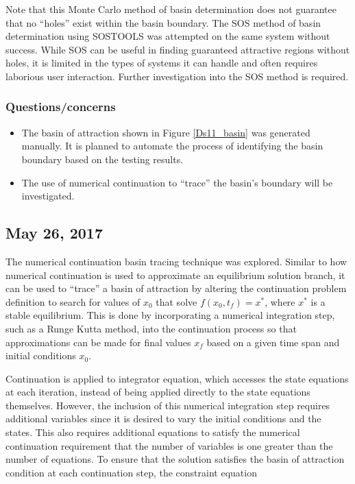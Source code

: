 \documentclass[12pt]{article}
\begin{document}
Note that this Monte Carlo method of basin determination does not guarantee that no ``holes'' exist within the basin boundary. The SOS method of basin determination using SOSTOOLS \cite{sostools} was attempted on the same system without success. While SOS can be useful in finding guaranteed attractive regions without holes, it is limited in the types of systems it can handle and often requires laborious user interaction. Further investigation into the SOS method is required.

\subsubsection{Questions/concerns}
\begin{itemize}
\item The basin of attraction shown in Figure \ref{Ds11_basin} was generated manually. It is planned to automate the process of identifying the basin boundary based on the testing results.
\item The use of numerical continuation to ``trace'' the basin's boundary will be investigated. 
\end{itemize}


\subsection{May 26, 2017}
The numerical continuation basin tracing technique was explored. Similar to how numerical continuation is used to approximate an equilibrium solution branch, it can be used to ``trace'' a basin of attraction by altering the continuation problem definition to search for values of $x_0$ that solve $f(x_0,t_f)=x^*$, where $x^*$ is a stable equilibrium. This is done by incorporating a numerical integration step, such as a Runge Kutta method, into the continuation process so that approximations can be made for final values $x_f$ based on a given time span and initial conditions $x_0$. 

Continuation is applied to integrator equation, which accesses the state equations at each iteration, instead of being applied directly to the state equations themselves. However, the inclusion of this numerical integration step requires additional variables since it is desired to vary the initial conditions and the states. This also requires additional equations to satisfy the numerical continuation requirement that the number of variables is one greater than the number of equations. To ensure that the solution satisfies the basin of attraction condition at each continuation step, the constraint equation
\end{document}
